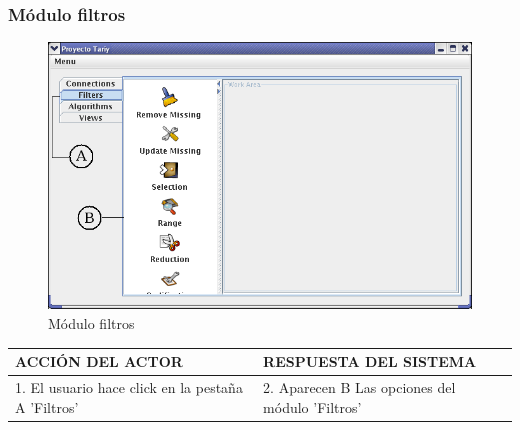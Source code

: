 \subsubsection{M\'odulo filtros}
\begin{figure}[ht]
\centering
\includegraphics[width=1\textwidth]{images/02.png}
\caption{M\'odulo filtros}
\end{figure}
\begin{center}
\begin{tabular}{|p{60mm}|p{60mm}|} \hline
ACCI\'ON DEL ACTOR & RESPUESTA DEL SISTEMA \\ \hline
1. El usuario hace click en la pesta\~na A 'Filtros' & 2. Aparecen B Las opciones del m\'odulo 'Filtros'\\ \hline
\end{tabular}
\end{center}

\newpage
